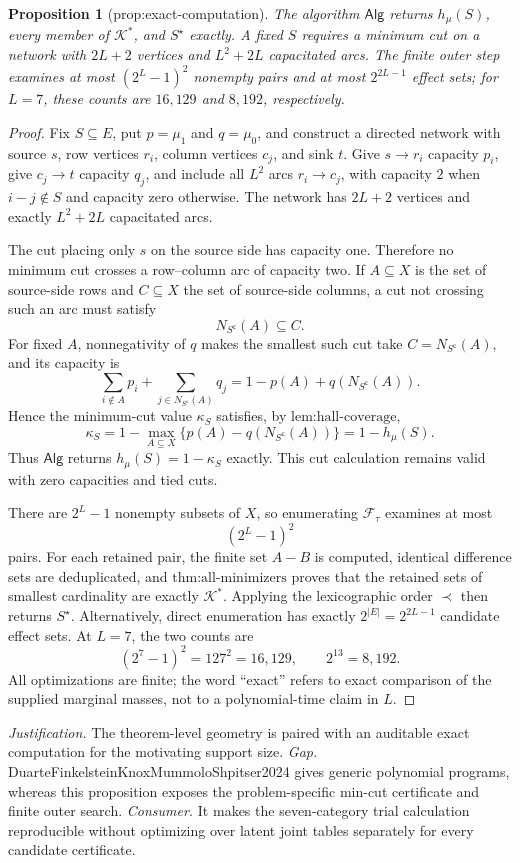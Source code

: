 \documentclass{article}
\newtheorem{proposition}{Proposition}
\begin{document}
\begin{proposition}[prop:exact-computation]\label{prop:exact-computation}
The algorithm \(\mathsf{Alg}\) returns \(h_{\mu}(S)\), every member of \(\mathcal K^*\), and \(S^\star\) exactly. A fixed \(S\) requires a minimum cut on a network with \(2L+2\) vertices and \(L^2+2L\) capacitated arcs. The finite outer step examines at most \((2^L-1)^2\) nonempty pairs and at most \(2^{2L-1}\) effect sets; for \(L=7\), these counts are \(16{,}129\) and \(8{,}192\), respectively.
\end{proposition}
\begin{proof}
Fix \(S\subseteq E\), put \(p=\mu_1\) and \(q=\mu_0\), and construct a directed network with source \(s\), row vertices \(r_i\), column vertices \(c_j\), and sink \(t\).  Give \(s\to r_i\) capacity \(p_i\), give \(c_j\to t\) capacity \(q_j\), and include all \(L^2\) arcs \(r_i\to c_j\), with capacity \(2\) when \(i-j\notin S\) and capacity zero otherwise.  The network has \(2L+2\) vertices and exactly \(L^2+2L\) capacitated arcs.

The cut placing only \(s\) on the source side has capacity one.  Therefore no minimum cut crosses a row--column arc of capacity two.  If \(A\subseteq X\) is the set of source-side rows and \(C\subseteq X\) the set of source-side columns, a cut not crossing such an arc must satisfy
\[
N_{S^{\mathsf c}}(A)\subseteq C.
\]
For fixed \(A\), nonnegativity of \(q\) makes the smallest such cut take \(C=N_{S^{\mathsf c}}(A)\), and its capacity is
\[
\sum_{i\notin A}p_i+\sum_{j\in N_{S^{\mathsf c}}(A)}q_j
=1-p(A)+q(N_{S^{\mathsf c}}(A)).
\]
Hence the minimum-cut value \(\kappa_S\) satisfies, by \(\text{lem:hall-coverage}\),
\[
\kappa_S
=1-\max_{A\subseteq X}\{p(A)-q(N_{S^{\mathsf c}}(A))\}
=1-h_{\mu}(S).
\]
Thus \(\mathsf{Alg}\) returns \(h_{\mu}(S)=1-\kappa_S\) exactly.  This cut calculation remains valid with zero capacities and tied cuts.

There are \(2^L-1\) nonempty subsets of \(X\), so enumerating \(\mathcal F_{\tau}\) examines at most
\[
(2^L-1)^2
\]
pairs.  For each retained pair, the finite set \(A-B\) is computed, identical difference sets are deduplicated, and \(\text{thm:all-minimizers}\) proves that the retained sets of smallest cardinality are exactly \(\mathcal K^*\).  Applying the lexicographic order \(\prec\) then returns \(S^\star\).  Alternatively, direct enumeration has exactly \(2^{|E|}=2^{2L-1}\) candidate effect sets.  At \(L=7\), the two counts are
\[
(2^7-1)^2=127^2=16{,}129,
\qquad
2^{13}=8{,}192.
\]
All optimizations are finite; the word ``exact'' refers to exact comparison of the supplied marginal masses, not to a polynomial-time claim in \(L\).
\end{proof}
\par\smallskip\noindent \textit{Justification.} The theorem-level geometry is paired with an auditable exact computation for the motivating support size. \textit{Gap.} DuarteFinkelsteinKnoxMummoloShpitser2024 gives generic polynomial programs, whereas this proposition exposes the problem-specific min-cut certificate and finite outer search. \textit{Consumer.} It makes the seven-category trial calculation reproducible without optimizing over latent joint tables separately for every candidate certificate.
\end{document}

